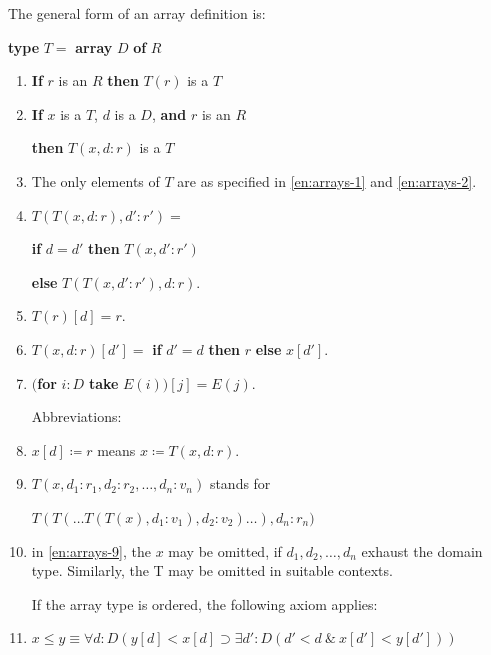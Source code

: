 \documentclass[twoside,11pt]{book}
\begin{document}
The general form of an array definition is:

\quad \textbf{type} $T =$ \textbf{array} $D$ \textbf{of} $R$

\begin{enumerate}[wide, nosep, label=(\arabic*)]
	\item \label{en:arrays-1}
	\textbf{If} $r$ is an $R$ \textbf{then} $T(r)$ is a $T$

	\item \label{en:arrays-2}
	\textbf{If} $x$ is a $T$, $d$ is a $D$, \textbf{and} $r$ is an $R$

	\qquad\quad \textbf{then} $T(x, d:r)$ is a $T$

	\item The only elements of $T$ are as specified in \ref{en:arrays-1} and \ref{en:arrays-2}.

	\item $T(T(x, d:r), d':r') =$

	\quad \textbf{if} $d = d'$ \textbf{then} $T(x, d':r')$

	\qquad\quad\textbf{else} $T(T(x, d':r'), d:r).$

	\item $T(r)[d] = r.$

	\item $T(x, d:r)[d'] =$ \textbf{if} $d' = d$ \textbf{then} $r$ \textbf{else} $x[d'].$

	\item $($\textbf{for} $i:D$ \textbf{take} $E(i))[j] = E(j).$

	\noindent
	Abbreviations:

	\item $x[d] \coloneq r$ means $x \coloneq T(x, d:r)$.

	\item\label{en:arrays-9}
	 $T(x, d_1:r_1, d_2 : r_2, \dots, d_n:v_n)$ stands for

	\quad $T(T(\dots T(T(x), d_1:v_1), d_2:v_2)\dots), d_n:r_n)$

	\item in \ref{en:arrays-9}, the $x$ may be omitted, if $d_1, d_2, \dots, d_n$ exhaust the domain type. Similarly, the T may be omitted in suitable contexts.

If the array type is ordered, the following axiom applies:

	\item $x \leqslant y \equiv \forall d: D(y[d] < x[d] \supset \exists d':D(d' < d\ \&\ x[d'] < y[d']))$
\end{enumerate}
\end{document}

